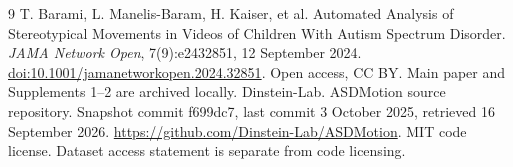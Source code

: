 \documentclass[11pt,a4paper]{article}
\begin{document}
\begin{thebibliography}{9}
 T. Barami, L. Manelis-Baram, H. Kaiser, et al. Automated Analysis of Stereotypical Movements in Videos of Children With Autism Spectrum Disorder. \emph{JAMA Network Open}, 7(9):e2432851, 12 September 2024. \href{https://doi.org/10.1001/jamanetworkopen.2024.32851}{doi:10.1001/jamanetworkopen.2024.32851}. Open access, CC BY. Main paper and Supplements 1--2 are archived locally.
 Dinstein-Lab. ASDMotion source repository. Snapshot commit f699dc7, last commit 3 October 2025, retrieved 16 September 2026. \url{https://github.com/Dinstein-Lab/ASDMotion}. MIT code license. Dataset access statement is separate from code licensing.
\end{thebibliography}
\end{document}
